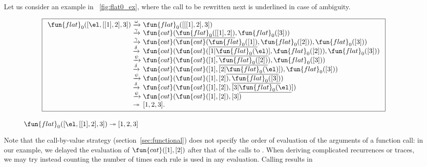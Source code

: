Let us consider an example in \fig~\vref{fig:flat0_ex}, where the call
to be rewritten next is underlined in case of ambiguity.
\begin{figure}
\begin{equation*}
\boxed{%
\begin{array}{r@{\;}l@{\;}l}
\fun{flat}_0([\el,[[1],2],3])
& \xrightarrow{\smash{\omega}}
& \fun{flat}_0([[[1],2],3])\\
& \xrightarrow{\smash{\gamma}}
& \fun{cat}(\underline{\fun{flat}_0([[1],2])},\fun{flat}_0([3]))\\
& \xrightarrow{\smash{\gamma}}
& \fun{cat}(\fun{cat}(\underline{\fun{flat}_0([1])},\fun{flat}_0([2])),\fun{flat}_0([3]))\\
& \xrightarrow{\smash{\delta}}
& \fun{cat}(\fun{cat}([1|\underline{\fun{flat}_0(\el)}],\fun{flat}_0([2])),\fun{flat}_0([3]))\\
& \xrightarrow{\smash{\psi}}
& \fun{cat}(\fun{cat}([1],\underline{\fun{flat}_0([2])}),\fun{flat}_0([3]))\\
& \xrightarrow{\smash{\delta}}
& \fun{cat}(\fun{cat}([1],[2|\underline{\fun{flat}_0(\el)}]),\fun{flat}_0([3]))\\
& \xrightarrow{\smash{\psi}}
& \fun{cat}(\fun{cat}([1],[2]),\underline{\fun{flat}_0([3])})\\
& \xrightarrow{\smash{\delta}}
& \fun{cat}(\fun{cat}([1],[2]),[3|\underline{\fun{flat}_0(\el)}])\\
& \xrightarrow{\smash{\psi}}
& \fun{cat}(\fun{cat}([1],[2]),[3])\\
& \twoheadrightarrow & [1,2,3].
\end{array}
}
\end{equation*}
\caption{\(\fun{flat}_0([\el,[[1],2],3]) \twoheadrightarrow [1,2,3]\)
\label{fig:flat0_ex}}
\end{figure}
Note that the call\hyp{}by\hyp{}value strategy (section~\ref{sec:functional}) does
not specify the order of evaluation of the arguments of a function
call: in our example, we delayed the evaluation of
\(\fun{cat}([1],[2])\)  after that of the
calls to . When
deriving complicated recurrences or traces, we may try instead
counting the number of times each rule is used in any
evaluation. Calling 
results in
